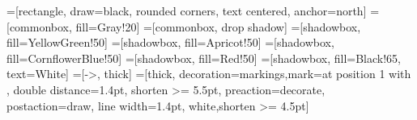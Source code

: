 =[rectangle, draw=black, rounded corners, text centered,
	anchor=north]
=[commonbox, fill=Gray!20]
=[commonbox, drop shadow]
=[shadowbox, fill=YellowGreen!50]
=[shadowbox, fill=Apricot!50]
=[shadowbox, fill=CornflowerBlue!50]
=[shadowbox, fill=Red!50]
=[shadowbox, fill=Black!65, text=White]
=[->, thick]
=[thick, decoration={markings,mark=at position
	1 with {}},
	double distance=1.4pt, shorten >= 5.5pt,
	preaction={decorate},
	postaction={draw, line width=1.4pt, white,shorten >= 4.5pt}]
